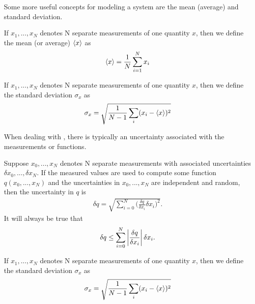 Some more useful concepts for modeling a system are the mean (average) and standard deviation. 

\begin{defn}
	If $x_1, ..., x_N$ denotes N separate measurements of one quantity $x$, then we define the mean (or average) $\braket{x}$ as
	\begin{align}
		\braket{x} = \frac{1}{N}\sum_{i=1}^{N}x_i \label{mean equation}
	\end{align}
\end{defn}

\begin{defn}
	If $x_1, ..., x_N$ denotes N separate measurements of one quantity $x$, then we define the standard deviation $\sigma_x$ as
	\begin{align}
		\sigma_x = \sqrt{\frac{1}{N-1}\sum_{i}(x_i-\braket{x})^2}
	\end{align}
\end{defn}

When dealing with , there is typically an uncertainty associated with the measurements or functions.

\begin{defn}
	Suppose $x_0, ..., x_N$ denotes N separate measurements with associated uncertainties $\delta x_0, ..., \delta x_N$. If the measured values are used to compute some function $q(x_0, ..., x_N)$ and the uncertainties in $x_0, ..., x_N$ are independent and random, then the uncertainty in $q$ is
	\begin{align}
		\delta q = \sqrt{\sum_{i=0}^{N}\bigg(\frac{\delta q}{\delta x_i} \delta x_i\bigg)^2}.
	\end{align}
 It will always be true that 
 	\begin{align}
		\delta q \leq \sum_{i=0}^{N}\left| \frac{\delta q}{\delta x_i} \right| \delta x_i.
	\end{align}
\end{defn}

\begin{defn}
	If $x_1, ..., x_N$ denotes N separate measurements of one quantity $x$, then we define the standard deviation $\sigma_x$ as
	\begin{align}
		\sigma_x = \sqrt{\frac{1}{N-1}\sum_{i}(x_i-\braket{x})^2}
	\end{align}
\end{defn}
